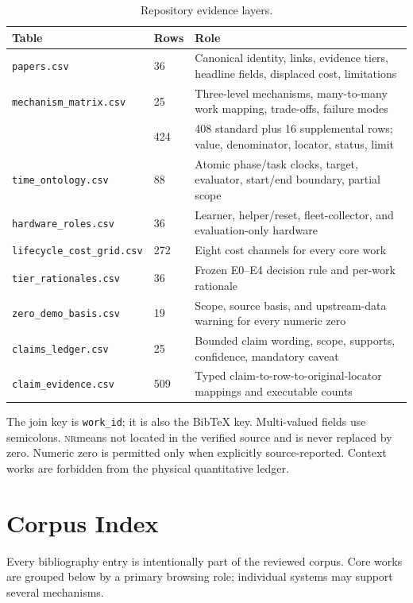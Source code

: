 \documentclass[11pt]{article}
\newcommand{\NR}{\textsc{nr}}
\begin{document}
\begin{table}[ht]
\centering
\caption{Repository evidence layers.}
\label{tab:schema}
\begin{tabularx}{\textwidth}{p{}p{}Y}
\toprule
Table & Rows & Role \\
\midrule
\texttt{papers.csv} & 36 & Canonical identity, links, evidence tiers, headline fields, displaced cost, limitations \\
\texttt{mechanism\_matrix.csv} & 25 & Three-level mechanisms, many-to-many work mapping, trade-offs, failure modes \\
 & 424 & 408 standard plus 16 supplemental rows; value, denominator, locator, status, limit \\
\texttt{time\_ontology.csv} & 88 & Atomic phase/task clocks, target, evaluator, start/end boundary, partial scope \\
\texttt{hardware\_roles.csv} & 36 & Learner, helper/reset, fleet-collector, and evaluation-only hardware \\
\texttt{lifecycle\_cost\_}\linebreak\texttt{grid.csv} & 272 & Eight cost channels for every core work \\
\texttt{tier\_rationales.csv} & 36 & Frozen E0--E4 decision rule and per-work rationale \\
\texttt{zero\_demo\_basis.csv} & 19 & Scope, source basis, and upstream-data warning for every numeric zero \\
\texttt{claims\_ledger.csv} & 25 & Bounded claim wording, scope, supports, confidence, mandatory caveat \\
\texttt{claim\_evidence.csv} & 509 & Typed claim-to-row-to-original-locator mappings and executable counts \\
\bottomrule
\end{tabularx}
\end{table}

The join key is \texttt{work\_id}; it is also the BibTeX key. Multi-valued fields use semicolons. \NR means not located in the verified source and is never replaced by zero. Numeric zero is permitted only when explicitly source-reported. Context works are forbidden from the physical quantitative ledger.

\section{Corpus Index}

Every bibliography entry is intentionally part of the reviewed corpus. Core works are grouped below by a primary browsing role; individual systems may support several mechanisms.
\end{document}
